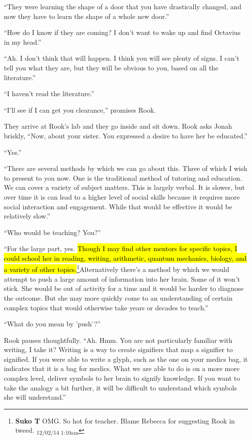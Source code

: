 ``They were learning the shape of a door that you have drastically changed, and now they have to learn the shape of a whole new door.''

``How do I know if they are coming?  I don't want to wake up and find Octavius in my head.'' 

``Ah.  I don't think that will happen.  I think you will see plenty of signs.  I can't tell you what they are, but they will be obvious to you, based on all the literature.''

``I haven't read the literature.''

``I'll see if I can get you clearance,'' promises Rook.



They arrive at Rook's lab and they go inside and sit down.  Rook asks Jonah briskly, ``Now, about your sister.  You expressed a desire to have her be educated.''

``Yes.''

``There are several methods by which we can go about this.  Three of which I wish to present to you now.  One is the traditional method of tutoring and education.  We can cover a variety of subject matters.  This is largely verbal.  It is slower, but over time it is can lead to a higher level of social skills because it requires more social interaction and engagement.  While that would be effective it would be relatively slow.''

``Who would be teaching?  You?''

``For the large part, yes.  \hl{Though I may find other mentors for specific topics, I could school her in reading, writing, arithmetic, quantum mechanics, biology, and a variety of other topics.}\footnote{\textbf{Suko T }OMG.  So hot for teacher.  Blame Rebecca for suggesting Rook in tweed. \textsubscript{12/02/14 1:10am}}Alternatively there's a method by which we would attempt to push a large amount of information into her brain.  Some of it won't stick.  She would be out of activity for a time and it would be harder to diagnose the outcome.  But she may more quickly come to an understanding of certain complex topics that would otherwise take years or decades to teach.''

``What do you mean by 'push'?''

Rook pauses thoughtfully.  ``Ah.  Hmm.  You are not particularly familiar with writing, I take it?  Writing is a way to create signifiers that map a signifier to signified.  If you were able to write a glyph, such as the one on your medics bag, it indicates that it is a bag for medics.  What we are able to do is on a more more complex level, deliver symbols to her brain to signify knowledge.  If you want to take the analogy a bit further, it will be difficult to understand which symbols she will understand.''

